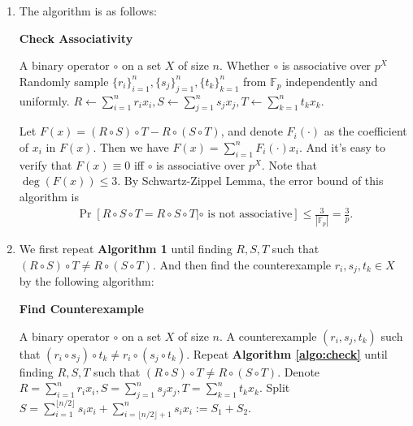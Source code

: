\begin{answer}
	\begin{enumerate}[label=\alph*).]
		\item The algorithm is as follows:
		\begin{algo}
			\caption{\textbf{Check Associativity}}
			\label{algo:check}
			\begin{algorithmic}[1]
				\Require A binary operator $\circ$ on a set $X$ of size $n$.
				\Ensure Whether $\circ$ is associative over $p^X$
				\State Randomly sample $\{r_i\}_{i=1}^n, \{s_j\}_{j=1}^n, \{t_k\}_{k=1}^n$ from $\mathbb{F}_p$ independently and uniformly.
				\State $R \leftarrow \sum_{i=1}^{n}r_ix_i, S \leftarrow \sum_{j=1}^{n}s_jx_j, T \leftarrow \sum_{k=1}^{n}t_kx_k$.
					\State \Return {}
				\Else 
					\State \Return {}
				\EndIf
			\end{algorithmic}
		\end{algo}
		Let $F(x) = (R\circ S)\circ T - R\circ(S\circ T)$, and denote $F_i(\cdot)$ as the coefficient of $x_i$ in $F(x)$. Then we have
			$F(x) = \sum_{i=1}^{n}F_i(\cdot)x_i. $
		And it's easy to verify that $F(x) \equiv 0$ iff $\circ$ is associative over $p^X$. Note that $\deg(F(x)) \le 3$. 
		By Schwartz-Zippel Lemma, the error bound of this algorithm is 
		\begin{align*}
			\Pr[R\circ S\circ T = R\circ S\circ T|\text{$\circ$ is not associative}] \le \frac{3}{|\mathbb{F}_p|} = \frac{3}{p}.
		\end{align*}
		\item We first repeat \textbf{Algorithm 1} until finding $R, S, T$ such that $(R\circ S)\circ T\neq R\circ(S\circ T)$. 
		And then find the counterexample $r_i, s_j, t_k \in X$ by the following algorithm:
		\begin{algo}
			\caption{\textbf{Find Counterexample}}
			\label{algo:find}
			\begin{algorithmic}[1]
				\Require A binary operator $\circ$ on a set $X$ of size $n$.
				\Ensure A counterexample $(r_i, s_j, t_k)$ such that $(r_i\circ s_j)\circ t_k\neq r_i\circ(s_j\circ t_k)$.
				\State Repeat \textbf{Algorithm \ref{algo:check}} until finding $R, S, T$ such that $(R\circ S)\circ T\neq R\circ(S\circ T)$.
				\State Denote $R = \sum_{i=1}^{n}r_ix_i, S = \sum_{j=1}^{n}s_jx_j, T = \sum_{k=1}^{n}t_kx_k$.
				 \Comment{$|R| := \#\{r_i|r_i \neq 0\}$, etc.}
					\State Split $S = \sum_{i=1}^{\lfloor n/2\rfloor}s_ix_i + \sum_{i=\lfloor n/2\rfloor+1}^{n}s_ix_i := S_1 + S_2$. \Comment {assume $|S| = \max\{|R|, |S|, |T|\}$}

\end{algorithmic}
\end{algo}
\end{enumerate}
\end{answer}

